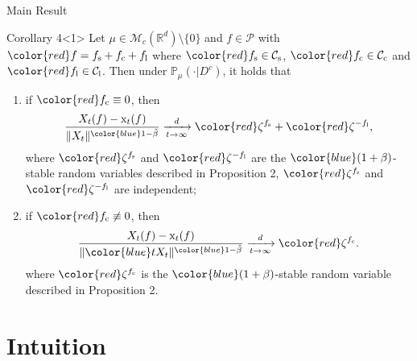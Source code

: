 \documentclass[xcolor=dvipsnames]{beamer}
\begin{document}
\begin{frame}{Main Result}
\begin{block}{Corollary 4}<1>
Let $\mu\in \mathcal M_c(\mathbb R^d)\setminus \{0\}$ and $f\in \mathcal P$ with $\color{red}f=f_\mathrm s + f_\mathrm c+ f_\mathrm l$ where $\color{red}f_\mathrm s \in \mathcal C_\mathrm s$, $\color{red}f_\mathrm c\in \mathcal C_\mathrm c$ and $\color{red}f_\mathrm l \in \mathcal C_\mathrm l$.
Then under $\mathbb{P}_{\mu}(\cdot| D^c)$, it holds that
\begin{enumerate}
\item  if $\color{red}f_\mathrm c\equiv 0$, then
\[
    \frac{ X_t(f) - \mathrm x_t(f)} {\|X_t\|^{{\color{blue}1-\tilde \beta}}}
    \xrightarrow[t\to \infty]{d}
       {\color{red}\zeta^{f_\mathrm s}}+{\color{red}\zeta^{-f_\mathrm l}},
\]
	where $\color{red}\zeta^{f_\mathrm s}$ and $\color{red}\zeta^{-f_\mathrm l}$  are the $\color{blue}(1+\beta)$-{\color{PineGreen}stable random variables} described in Proposition 2, $\color{red}\zeta^{f_\mathrm s}$ and $\color{red}\zeta^{-f_\mathrm l}$ are independent;
\item if $\color{red}f_\mathrm c\not \equiv 0$, then
\[
    \frac{ X_t(f) - \mathrm x_t(f)}{\|{\color{blue}t}X_t\|^{{\color{blue}1-\tilde \beta}}}
    \xrightarrow[t\to \infty]{d}{\color{red}\zeta^{f_\mathrm c}}.
\]
	where $\color{red}\zeta^{f_\mathrm c}$ is the $\color{blue}(1+\beta)$-{\color{PineGreen}stable random variable} described in Proposition 2.
\end{enumerate}
\end{block}
\end{frame}

\section{Intuition}
\end{document}
